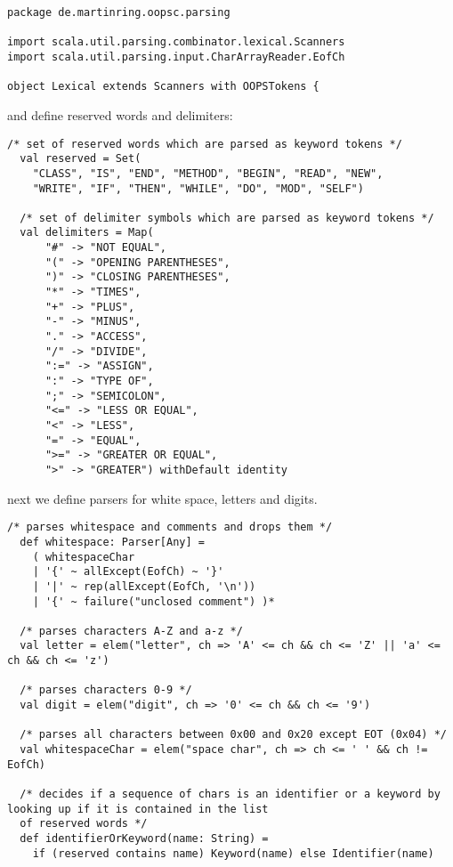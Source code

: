 \documentclass{style}
\begin{document}
\begin{lstlisting}[name=lexical]
package de.martinring.oopsc.parsing

import scala.util.parsing.combinator.lexical.Scanners
import scala.util.parsing.input.CharArrayReader.EofCh

object Lexical extends Scanners with OOPSTokens {
\end{lstlisting}

and define reserved words and delimiters:

\begin{lstlisting}[name=lexical]
  /* set of reserved words which are parsed as keyword tokens */
  val reserved = Set(
    "CLASS", "IS", "END", "METHOD", "BEGIN", "READ", "NEW",
    "WRITE", "IF", "THEN", "WHILE", "DO", "MOD", "SELF")

  /* set of delimiter symbols which are parsed as keyword tokens */
  val delimiters = Map(
      "#" -> "NOT EQUAL",
      "(" -> "OPENING PARENTHESES",
      ")" -> "CLOSING PARENTHESES",
      "*" -> "TIMES",
      "+" -> "PLUS",
      "-" -> "MINUS",
      "." -> "ACCESS",
      "/" -> "DIVIDE",
      ":=" -> "ASSIGN",
      ":" -> "TYPE OF",
      ";" -> "SEMICOLON",
      "<=" -> "LESS OR EQUAL",
      "<" -> "LESS",
      "=" -> "EQUAL",
      ">=" -> "GREATER OR EQUAL",
      ">" -> "GREATER") withDefault identity

\end{lstlisting}

next we define parsers for white space, letters and digits.

\begin{lstlisting}[name=lexical]
  /* parses whitespace and comments and drops them */
  def whitespace: Parser[Any] =
    ( whitespaceChar
    | '{' ~ allExcept(EofCh) ~ '}'
    | '|' ~ rep(allExcept(EofCh, '\n'))
    | '{' ~ failure("unclosed comment") )*

  /* parses characters A-Z and a-z */
  val letter = elem("letter", ch => 'A' <= ch && ch <= 'Z' || 'a' <= ch && ch <= 'z')

  /* parses characters 0-9 */
  val digit = elem("digit", ch => '0' <= ch && ch <= '9')

  /* parses all characters between 0x00 and 0x20 except EOT (0x04) */
  val whitespaceChar = elem("space char", ch => ch <= ' ' && ch != EofCh)

  /* decides if a sequence of chars is an identifier or a keyword by looking up if it is contained in the list
  of reserved words */
  def identifierOrKeyword(name: String) =
    if (reserved contains name) Keyword(name) else Identifier(name)
\end{lstlisting}
\end{document}

